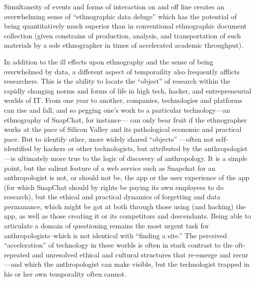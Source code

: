 \documentclass[10pt,letter,oneside]{scrartcl}
\begin{document}
Simultaneity of events and forms of interaction on and off line creates 
an overwhelming sense of ``ethnographic data deluge'' which has the potential 
of being quantitatively much superior than in conventional ethnographic 
document collection (given constrains of production, analysis, and 
transportation of such materials by a sole ethnographer in times of 
accelerated academic throughput). 

In addition to the ill effects upon ethnography and the sense of being
overwhelmed by data, a different aspect of temporaility also frequently 
afflicts researchers.  This is the ability to locate the ``object'' 
of research within the rapidly changing norms and forms of life in 
high tech, hacker, and entrepreneurial worlds of IT. From one year to 
another, companies, technologies and platforms can rise and fall, 
and so pegging one's work to a particular technology---an ethnography 
of SnapChat, for instance--- can only bear fruit if the ethnographer 
works at the pace of Silicon Valley and its pathological economic and 
practical pace.  But to identify other, more widely shared ``objects''
---often not self-identified by hackers or other technologists, but 
attributed by the anthropologist---is ultimately more true to the 
logic of discovery of anthropology. It is a simple point, but the 
salient feature of a web service such as Snapchat for an anthropologist 
is not, or should not be, the app or the user experience of the app 
(for which SnapChat should by rights be paying its own employees 
to do research), but the ethical and practical dynamics of forgetting 
and data permanance, which might be got at both through those using 
(and hacking) the app, as well as those creating it or its competitors 
and descendants.   Being able to articulate a domain of questioning 
remains the most urgent task for anthropologists--which is not identical 
with ``finding a site.''  The perceived ``acceleration'' of technology 
in these worlds is often in stark contrast to the oft-repeated and 
unresolved ethical and cultural structures that re-emerge and 
recur---and which the anthropologist can make visible, but the 
technologist trapped in his or her own temporality often cannot.  

\end{document}
